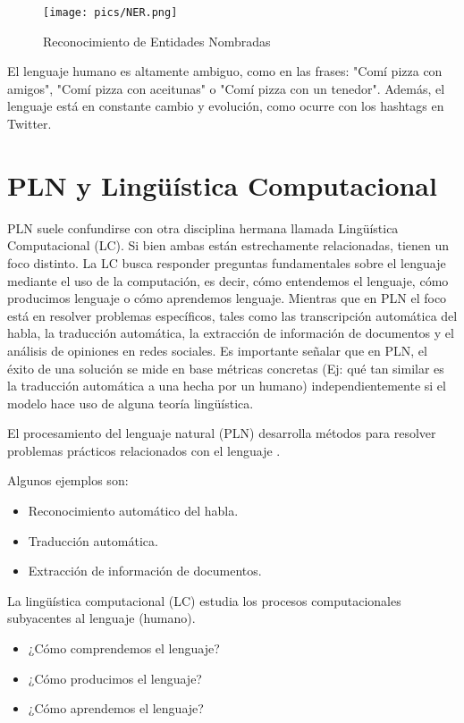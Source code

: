 \documentclass{book}
\begin{document}
\begin{figure}[h]
	\texttt{[image: pics/NER.png]}
	\caption{Reconocimiento de Entidades Nombradas}
\end{figure}

El lenguaje humano es altamente ambiguo, como en las frases: "Comí pizza con amigos", "Comí pizza con aceitunas" o "Comí pizza con un tenedor". Además, el lenguaje está en constante cambio y evolución, como ocurre con los hashtags en Twitter.

\section{PLN y Lingüística Computacional}
PLN suele confundirse con otra disciplina hermana llamada Lingüística Computacional (LC). Si bien ambas están estrechamente relacionadas, tienen un foco distinto. La LC busca responder preguntas fundamentales sobre el lenguaje mediante el uso de la computación, es decir, cómo entendemos el lenguaje, cómo producimos lenguaje o cómo aprendemos lenguaje. Mientras que en PLN el foco está en resolver problemas específicos, tales como las transcripción automática del habla, la traducción automática, la extracción de información de documentos y el análisis de opiniones en redes sociales. Es importante señalar que en PLN, el éxito de una solución se mide en base métricas concretas (Ej: qué tan similar es la traducción automática a una hecha por un humano) independientemente si el modelo hace uso de alguna teoría lingüística.



El procesamiento del lenguaje natural (PLN) desarrolla métodos para resolver problemas prácticos relacionados con el lenguaje \cite{JohnsonMLSS}.

Algunos ejemplos son:

\begin{itemize}
  \item Reconocimiento automático del habla.
  \item Traducción automática.
  \item Extracción de información de documentos.
\end{itemize}

La lingüística computacional (LC) estudia los procesos computacionales subyacentes al lenguaje (humano).

\begin{itemize}
  \item ¿Cómo comprendemos el lenguaje?
  \item ¿Cómo producimos el lenguaje?
  \item ¿Cómo aprendemos el lenguaje?
\end{itemize}
\end{document}
